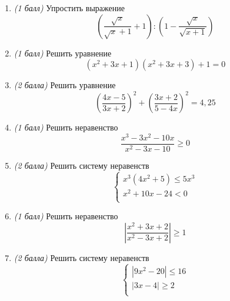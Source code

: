 \documentclass[12pt, a4paper]{article}
\begin{document}
	
	\begin{enumerate}
		\item \textit{(1 балл)} Упростить выражение $$\left(\dfrac{\sqrt{x}}{\sqrt{x}+1}+1\right):\left(1-\dfrac{\sqrt{x}}{\sqrt{x+1}}\right)$$
		\item \textit{(1 балл)} Решить уравнение $$(x^2+3x+1)(x^2+3x+3)+1=0$$
		\item \textit{(2 балла)} Решить уравнение $$\left(\dfrac{4x-5}{3x+2}\right)^2+\left(\dfrac{3x+2}{5-4x}\right)^2=4,25$$
		\item \textit{(1 балл)} Решить неравенство $$\dfrac{x^3-3x^2-10x}{x^2-3x-10}\geq 0$$
		\item \textit{(2 балла)} Решить систему неравенств 
		$$
		\left\{
		\begin{array}{l}
			x^3(4x^2+5) \leq 5x^3\\
			x^2+10x-24 < 0\\
		\end{array}
		\right.
		$$
		\item \textit{(1 балл)} Решить неравенство $$\left|\dfrac{x^2+3x+2}{x^2-3x+2}\right|\geq 1$$
		\item \textit{(2 балла)} Решить систему неравенств 
		$$
		\left\{
		\begin{array}{l}
			|9x^2-20| \leq 16\\
			|3x-4| \geq 2\\
		\end{array}
		\right.
		$$
	\end{enumerate}
\end{document}

